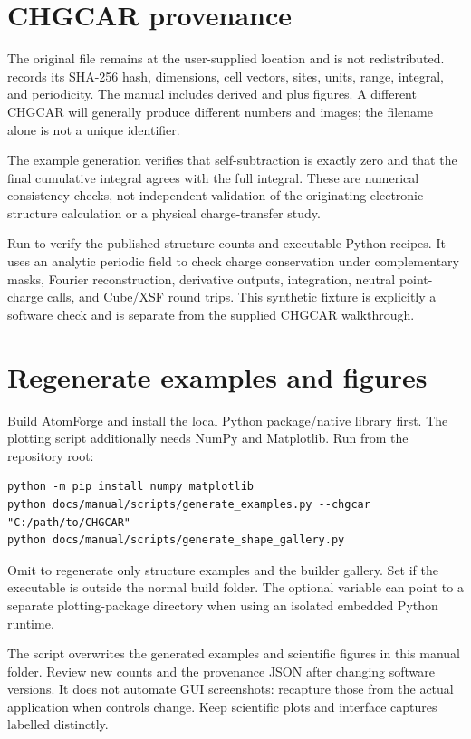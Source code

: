 \section{CHGCAR provenance}
The original file remains at the user-supplied location and is not redistributed.  records its SHA-256 hash, dimensions, cell vectors, sites, units, range, integral, and periodicity. The manual includes derived  and  plus figures. A different CHGCAR will generally produce different numbers and images; the filename alone is not a unique identifier.

The example generation verifies that self-subtraction is exactly zero and that the final cumulative integral agrees with the full integral. These are numerical consistency checks, not independent validation of the originating electronic-structure calculation or a physical charge-transfer study.

Run  to verify the published structure counts and executable Python recipes. It uses an analytic periodic field to check charge conservation under complementary masks, Fourier reconstruction, derivative outputs, integration, neutral point-charge calls, and Cube/XSF round trips. This synthetic fixture is explicitly a software check and is separate from the supplied CHGCAR walkthrough.

\section{Regenerate examples and figures}
Build AtomForge and install the local Python package/native library first. The plotting script additionally needs NumPy and Matplotlib. Run from the repository root:
\begin{lstlisting}
python -m pip install numpy matplotlib
python docs/manual/scripts/generate_examples.py --chgcar "C:/path/to/CHGCAR"
python docs/manual/scripts/generate_shape_gallery.py
\end{lstlisting}
Omit  to regenerate only structure examples and the builder gallery. Set  if the executable is outside the normal build folder. The optional  variable can point to a separate plotting-package directory when using an isolated embedded Python runtime.

The script overwrites the generated examples and scientific figures in this manual folder. Review new counts and the provenance JSON after changing software versions. It does not automate GUI screenshots: recapture those from the actual application when controls change. Keep scientific plots and interface captures labelled distinctly.

